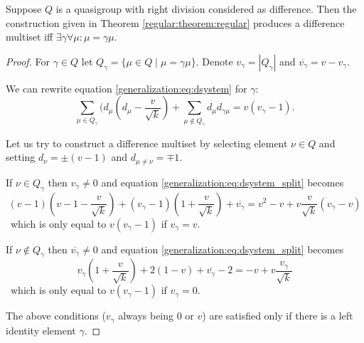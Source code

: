 \begin{theorem}
        \label{generalization:theorem:regular}
        Suppose $Q$ is a quasigroup with right division considered as difference. Then the construction given in Theorem \ref{regular:theorem:regular} produces a difference multiset iff $\exists \gamma \forall \mu \colon \mu=\gamma\mu$.
    \end{theorem}
    
    \begin{proof}
        For $\gamma \in Q$ let $Q_\gamma=\{\mu\in Q\mid \mu=\gamma\mu\}$.
        Denote $v_\gamma = |Q_\gamma|$ and $\overline{v_\gamma} = v - v_\gamma$.
        
        We can rewrite equation \eqref{generalization:eq:dsystem} for $\gamma$:
        \begin{equation}
            \label{generalization:eq:dsystem_split}
            \sum\limits_{\mu \in Q_\gamma} (d_\mu (d_\mu-\frac v {\sqrt k})
            + \sum\limits_{\mu \notin Q_\gamma} d_\mu d_{\gamma\mu}
             = v(v_\gamma - 1).
        \end{equation}

        Let us try to construct a difference multiset by selecting element $\nu \in Q$ and setting $d_\nu=\pm(v-1)$ and $d_{\mu\neq\nu}=\mp 1$.
        
        If $\nu \in Q_\gamma$ then $v_\gamma \neq 0$ and equation \eqref{generalization:eq:dsystem_split} becomes
        \begin{equation}
            (v-1)(v-1-\frac v {\sqrt k}) 
             + (v_\gamma - 1)(1 + \frac v {\sqrt k})
             + \overline{v_\gamma}
            = v^2 - v + v \frac v {\sqrt k} (v_\gamma-v)
        \end{equation}\
        which is only equal to $v(v_\gamma - 1)$ if $v_\gamma=v$.
        
        If $\nu \notin Q_\gamma$ then $\overline{v_\gamma} \neq 0$ and equation \eqref{generalization:eq:dsystem_split} becomes
        \begin{equation}
            v_\gamma (1 + \frac v {\sqrt k})
             + 2 (1 - v)
             + \overline{v_\gamma} - 2
            = -v + v \frac {v_\gamma} {\sqrt k}
        \end{equation}\
        which is only equal to $v(v_\gamma - 1)$ if $v_\gamma=0$.
        
        The above conditions ($v_\gamma$ always being $0$ or $v$) are satisfied only if there is a left identity element $\gamma$.
    \end{proof}


